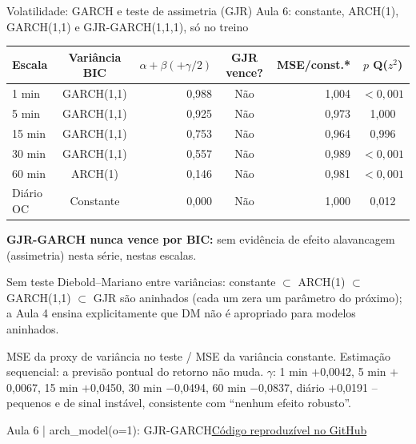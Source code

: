 \documentclass[aspectratio=169,10pt]{beamer}
\newcommand{\source}[2]{\par\vfill{\raggedright\tiny\color{muted}#1\quad\href{#2}{Código reproduzível no GitHub}\par}}
\newcommand{\tagline}[1]{{\small\color{teal}#1}\par\medskip}
\begin{document}
\begin{frame}[t]{Volatilidade: GARCH e teste de assimetria (GJR)}
\tagline{Aula 6: constante, ARCH(1), GARCH(1,1) e GJR-GARCH(1,1,1), só no treino}
\centering\small\begin{tabular}{lcrcrc}
\toprule
Escala & Variância BIC & $\alpha+\beta(+\gamma/2)$ & GJR vence? & MSE/const.* & $p$ Q($z^2$) \\ \midrule
1 min & GARCH(1,1) & 0,988 & Não & 1,004 & $<0{,}001$ \\
5 min & GARCH(1,1) & 0,925 & Não & 0,973 & 1,000 \\
15 min & GARCH(1,1) & 0,753 & Não & 0,964 & 0,996 \\
30 min & GARCH(1,1) & 0,557 & Não & 0,989 & $<0{,}001$ \\
60 min & ARCH(1) & 0,146 & Não & 0,981 & $<0{,}001$ \\
Diário OC & Constante & 0,000 & Não & 1,000 & 0,012 \\
\bottomrule
\end{tabular}\par
\raggedright\medskip\small\textbf{GJR-GARCH nunca vence por BIC:} sem evidência de efeito alavancagem (assimetria) nesta série, nestas escalas.\par
\alert{Sem teste Diebold--Mariano entre variâncias:} constante $\subset$ ARCH(1) $\subset$ GARCH(1,1) $\subset$ GJR são aninhados (cada um zera um parâmetro do próximo); a Aula 4 ensina explicitamente que DM não é apropriado para modelos aninhados.\par\smallskip
\scriptsize *MSE da proxy de variância no teste / MSE da variância constante. Estimação sequencial: a previsão pontual do retorno não muda. $\gamma$: 1 min $+$0,0042, 5 min $+$0,0067, 15 min $+$0,0450, 30 min $-$0,0494, 60 min $-$0,0837, diário $+$0,0191 -- pequenos e de sinal instável, consistente com ``nenhum efeito robusto''.
\source{Aula 6 | arch\_model(o=1): GJR-GARCH}{https://github.com/avilarenan/EAD6034/blob/main/src/ead6034/conditional_volatility.py}
\end{frame}
\end{document}
